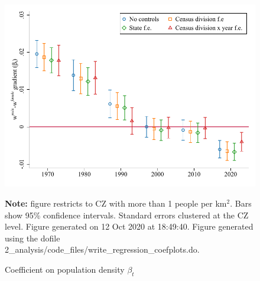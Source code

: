 \begin{figure}[!h]
\centering
\caption{Coefficient on population density $ \beta_t $}
\includegraphics[width=.6\textwidth]{../2_analysis/output/figures/baseline_gradients_l_czone_pop_full_time}
\par \begin{minipage}[h]{\textwidth}{\tiny\textbf{Note:} figure restricts to CZ with more than 1 people per km$^2$. Bars show 95\% confidence intervals. Standard errors clustered at the CZ level. Figure generated on 12 Oct 2020 at 18:49:40. Figure generated using the dofile 2\_analysis/code\_files/write\_regression\_coefplots.do.}\end{minipage}
\end{figure}
